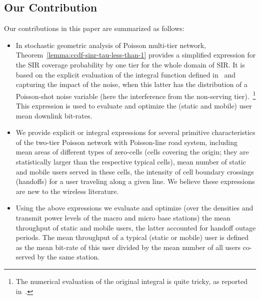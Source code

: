 \documentclass[10pt,journal]{IEEEtran}
\begin{document}
\subsection{Our Contribution}\label{subsection:our_contribution}
Our contributions in this paper are summarized as follows:
\begin{itemize}
\item In stochastic geometric analysis of Poisson multi-tier network, 
  Theorem~\ref{lemma:ccdf-sinr-tau-less-than-1} provides a simplified expression
  for the SIR coverage probability by one tier for the whole domain of
  SIR.  It is based on the explicit evaluation of the integral
  function 
  defined in~\cite[Equation~]{bartek-keeler15sinr-process-poisson-networks-factorial-moment-measures}
  and capturing  the impact of the noise, when this latter  has the distribution of a  Poisson-shot noise
 variable (here the interference from the non-serving
 tier).~\footnote{The numerical evaluation of the original integral
    is quite tricky, as reported
   in~\cite{keeler-programs}.}
This expression is used to evaluate and optimize the (static and
mobile) user mean downlink bit-rates.
 \item We provide explicit or integral expressions for several
   primitive characteristics of the two-tier Poisson network with
   Poisson-line road system, including mean areas of different types
   of zero-cells (cells covering the origin; they are statistically
   larger than the respective typical cells), mean number of static
   and mobile users served in these cells, the intensity of cell boundary
   crossings (handoffs) for a user traveling along a  given line.
We believe these expressions 
 are new to the wireless literature.
\item Using the above expressions we evaluate and optimize (over the densities and transmit power levels of the macro and micro base stations) the
  mean throughput of static and mobile users, the latter accounted
  for handoff outage periods. The mean throughput of a typical (static
  or mobile) user is defined as the mean bit-rate of this user divided
  by the mean number of all users co-served by the same station.   
 
 
\end{itemize}
\end{document}
